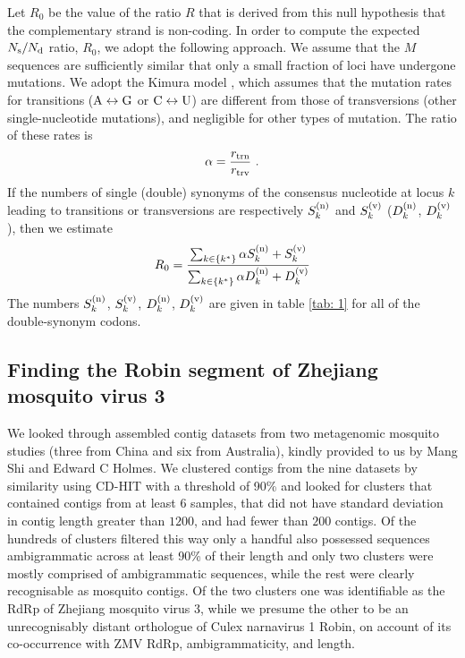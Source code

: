 \documentclass[unnumsec,webpdf,contemporary,large,namedate]{oup-authoring-template}%
\theoremstyle{thmstyleone}%
\theoremstyle{thmstyletwo}%
\theoremstyle{thmstylethree}%
\begin{document}
Let $R_0$ be the value of the ratio $R$ that is derived from this null hypothesis that
the complementary strand is non-coding.
In order to compute the expected $N_{\rm s}/N_{\rm d}$ ratio, $R_0$, we adopt the following
approach. We assume that the $M$ sequences are sufficiently similar
that only a small fraction of loci have undergone mutations.
We adopt the Kimura model \citep{Kim80}, which assumes that the mutation
rates for transitions (${\rm A}\leftrightarrow {\rm G}$ or ${\rm C}\leftrightarrow{\rm U}$) are
different from those of transversions (other single-nucleotide mutations), and negligible for
other types of mutation. The ratio of these rates is
%
\begin{equation}
\label{eq: 6.6}
\alpha=\frac{r_{\rm trn}}{r_{\rm trv}}
\ .
\end{equation}
%
If the numbers of single (double) synonyms of the consensus nucleotide at locus $k$ leading to
transitions or transversions are respectively $S^{({\rm n})}_k$ and $S^{({\rm v})}_k$
($D^{({\rm n})}_k$, $D^{({\rm v})}_k$), then we estimate
%
\begin{equation}
\label{eq: 4.7}
R_0=
\frac{\sum_{k\in\{k^\ast\}}\alpha S_k^{({\rm n})}+S^{({\rm v})}_k}
{\sum_{k\in\{k^\ast\}}\alpha D^{({\rm n})}_k+D_k^{({\rm v})}}
\end{equation}
%
The numbers $S^{({\rm n})}_k$, $S^{({\rm v})}_k$, $D^{({\rm n})}_k$, $D^{({\rm v})}_k$ are given
in table \ref{tab: 1} for all of the double-synonym codons.

\subsection{Finding the Robin segment of Zhejiang mosquito virus 3}

We looked through assembled contig datasets from two metagenomic mosquito studies (three from China and six from Australia)\cite{shi_16,shi_17}, kindly provided to us by Mang Shi and Edward C Holmes.
We clustered contigs from the nine datasets by similarity using CD-HIT\cite{fu_12} with a threshold of 90\% and looked for clusters that contained contigs from at least $6$ samples, that did not have standard deviation in contig length greater than $1 200$, and had fewer than $200$ contigs.
Of the hundreds of clusters filtered this way only a handful also possessed sequences ambigrammatic across at least 90\% of their length and only two clusters were mostly comprised of ambigrammatic sequences, while the rest were clearly recognisable as mosquito contigs.
Of the two clusters one was identifiable as the RdRp of Zhejiang mosquito virus 3, while we presume the other to be an unrecognisably distant orthologue of Culex narnavirus 1 Robin, on account of its co-occurrence with ZMV RdRp, ambigrammaticity, and length.
\end{document}
